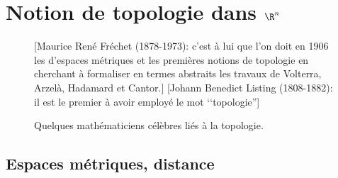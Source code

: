 \documentclass[class=report,crop=false]{standalone}
\begin{document}
\chapter{Notion de topologie dans $\R^n$}



  



\begin{figure}[!h]
    [Maurice René Fréchet (1878-1973): c'est à lui que l'on doit en  1906 les d'espaces métriques et les premières notions de topologie en cherchant à formaliser en termes abstraits les travaux de Volterra, Arzelà, Hadamard et Cantor.]
    {
        \label{fig:second_sub}
    }
    [\color{blue}Johann Benedict Listing (1808-1882): il est le premier à avoir employé le mot ‘‘topologie'']
    {
        \label{fig:third_sub}
    }
    \caption{Quelques mathématiciens célèbres liés à la topologie.}
    \label{fig:sample_subfigures}
\end{figure}




\section{Espaces métriques, distance}
\end{document}
